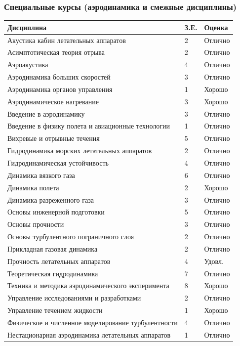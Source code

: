 \documentclass[a4paper,12pt]{article}
\begin{document}
	\subsubsection*{Специальные курсы (аэродинамика и смежные дисциплины)}
	{\fontsize{9}{11}\selectfont
	\begin{tabular}{p{} p{} p{}}
	\toprule
	\textbf{Дисциплина} & \textbf{З.Е.} & \textbf{Оценка} \\
	\midrule
	Акустика кабин летательных аппаратов & 2 & Отлично \\
	Асимптотическая теория отрыва & 2 & Отлично \\
	Аэроакустика & 4 & Отлично \\
	Аэродинамика больших скоростей & 3 & Отлично \\
	Аэродинамика органов управления & 1 & Хорошо \\
	Аэродинамическое нагревание & 3 & Хорошо \\
	Введение в аэродинамику & 3 & Отлично \\
	Введение в физику полета и авиационные технологии & 1 & Отлично \\
	Вихревые и отрывные течения & 5 & Отлично \\
	Гидродинамика морских летательных аппаратов & 2 & Отлично \\
	Гидродинамическая устойчивость & 4 & Отлично \\
	Динамика вязкого газа & 6 & Отлично \\
	Динамика полета & 2 & Хорошо \\
	Динамика разреженного газа & 3 & Отлично \\
	Основы инженерной подготовки & 5 & Отлично \\
	Основы прочности & 3 & Отлично \\
	Основы турбулентного пограничного слоя & 2 & Отлично \\
	Прикладная газовая динамика & 2 & Отлично \\
	Прочность летательных аппаратов & 4 & Удовл. \\
	Теоретическая гидродинамика & 7 & Отлично \\
	Техника и методика аэродинамического эксперимента & 8 & Хорошо \\
	Управление исследованиями и разработками & 2 & Отлично \\
	Управление течением жидкости & 1 & Хорошо \\
	Физическое и численное моделирование турбулентности & 4 & Отлично \\
	Нестационарная аэродинамика летательных аппаратов & 1 & Отлично \\
	\bottomrule
	\end{tabular}}
	
\end{document}
